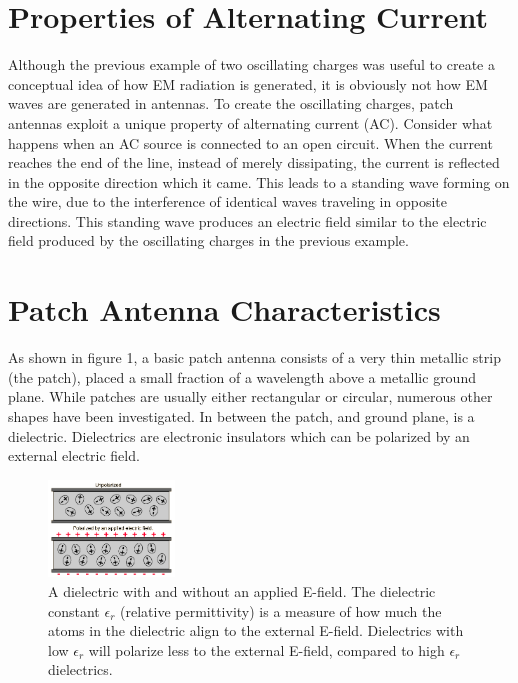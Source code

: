 \documentclass[12pt]{article}
\begin{document}
\section{Properties of Alternating Current}

Although the previous example of two oscillating charges was useful to create a conceptual idea of how EM radiation is generated, it is obviously not how EM waves are generated in antennas. To create the oscillating charges, patch antennas exploit a unique property of alternating current (AC). Consider what happens when an AC source is connected to an open circuit. When the current reaches the end of the line, instead of merely dissipating, the current is reflected in the opposite direction which it came. This leads to a standing wave forming on the wire, due to the interference of identical waves traveling in opposite directions. This standing wave produces an electric field similar to the electric field produced by the oscillating charges in the previous example. 

\section{Patch Antenna Characteristics}

As shown in figure 1, a basic patch antenna consists of a very thin metallic strip (the patch), placed a small fraction of a wavelength above a metallic ground plane. While patches are usually either rectangular or circular\cite{khan2015microstrip}, numerous other shapes have been investigated\cite{balanis2016antenna}. In between the patch, and ground plane, is a dielectric. Dielectrics are electronic insulators which can be polarized by an external electric field. 

\begin{figure}[h]
    \centering
    \includegraphics[width=0.3\textwidth]{dielectric.png}
    \caption{A dielectric with and without an applied E-field. The dielectric constant $\epsilon_r$ (relative permittivity) is a measure of how much the atoms in the dielectric align to the external E-field. Dielectrics with low $\epsilon_r$ will polarize less to the external E-field, compared to high $\epsilon_r$ dielectrics.}
\end{figure}
\end{document}

